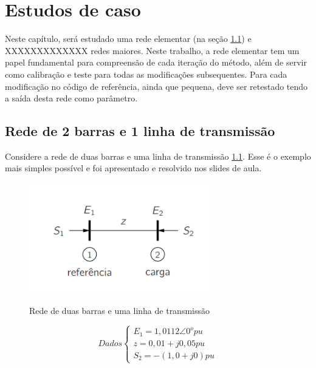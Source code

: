 \chapter{Estudos de caso}
\label{SectionEstudosDeCaso}
Neste capítulo, será estudado uma rede elementar (na seção \ref{SectionRedePequena}) e XXXXXXXXXXXXX redes maiores. Neste trabalho, a rede elementar tem um papel fundamental para compreensão de cada iteração do método, além de servir como calibração e teste para todas as modificações subsequentes. Para cada modificação no código de referência, ainda que pequena, deve ser retestado tendo a saída desta rede como parâmetro.
\section{Rede de 2 barras e 1 linha de transmissão}
\label{SectionRedePequena}
Considere a rede de duas barras e uma linha de transmissão \ref{FigRede2barras1linha}. Esse é o exemplo mais simples possível e foi apresentado e resolvido nos slides de aula.\\
\begin{figure}[!htb]
\caption{Rede de duas barras e uma linha de transmissão}
 \centering %
\includegraphics[width=8cm]{figuras/rede2barras1linha.PNG} 
\label{FigRede2barras1linha}
\end{figure}

\begin{equation}
Dados \left\{    \begin{array}{lll}
                E_1=1,0112	\angle 0^o pu\\
                z = 0,01+j0,05 pu\\
                S_2 = -(1,0+j0) pu
            \end{array}\right.
    \label{rede1_dados}
\end{equation}
